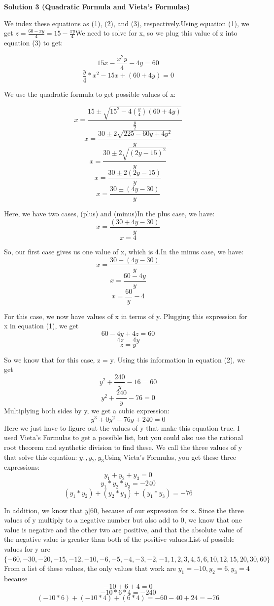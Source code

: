 \begin{enumerate}
\textbf{Solution 3 (Quadratic Formula and Vieta's Formulas)}

We index these equations as (1), (2), and (3), respectively.Using equation (1), we get $z = \frac{60 - xy}{4} = 15 - \frac{xy}{4}$We need to solve for x, so we plug this value of z into equation (3) to get:

 
 \[15x - \frac{x^2y}{4} - 4y = 60\]
 \[\frac{y}{4} * x^2 - 15x + (60 + 4y) = 0\]

 We use the quadratic formula to get possible values of x:

 
 \[x = \frac{15 \pm \sqrt{15^2 - 4(\frac{y}{4})(60 + 4y)}}{\frac{y}{2}}\]
 \[x = \frac{30 \pm 2\sqrt{225 - 60y + 4y^2}}{y}\]
 \[x = \frac{30 \pm 2\sqrt{(2y-15)^2}}{y}\]
 \[x = \frac{30 \pm 2(2y - 15)}{y}\]
 \[x = \frac{30 \pm (4y - 30)}{y}\]

 Here, we have two cases, (plus) and (minus)In the plus case, we have:
 \[x = \frac{(30 + 4y - 30)}{y}\]
 \[x = 4\]

 So, our first case gives us one value of x, which is 4.In the minus case, we have:
 \[x = \frac{30 - (4y - 30)}{y}\]
 \[x = \frac{60 - 4y}{y}\]
 \[x = \frac{60}{y} - 4\]

 For this case, we now have values of x in terms of y. Plugging this expression for x in equation (1), we get
 \[60 - 4y + 4z = 60\]
 \[4z = 4y\]
 \[z = y\]

 So we know that for this case, z = y. Using this information in equation (2), we get
 \[y^2 + \frac{240}{y} - 16 = 60\]
 \[y^2 + \frac{240}{y} - 76 = 0\]Multiplying both sides by y, we get a cubic expression:
 \[y^3 + 0y^2 - 76y + 240 = 0\]Here we just have to figure out the values of y that make this equation true. I used Vieta's Formulas to get a possible list, but you could also use the rational root theorem and synthetic division to find these. We call the three values of y that solve this equation: $y_{1},y_{2},y_{3}$Using Vieta's Formulas, you get these three expressions:
 \[y_{1} + y_{2} + y_{3} = 0\]
 \[y_{1} * y_{2} * y_{3} = -240\]
 \[(y_{1} * y_{2}) + (y_{2} * y_{3}) + (y_{1} * y_{3}) = -76\]

 In addition, we know that $y \vert 60$, because of our expression for x. Since the three values of y multiply to a negative number but also add to 0, we know that one value is negative and the other two are positive, and that the absolute value of the negative value is greater than both of the positive values.List of possible values for y are $\{-60,-30,-20,-15,-12,-10,-6,-5,-4,-3,-2,-1,1,2,3,4,5,6,10,12,15,20,30,60\}$From a list of these values, the only values that work are $y_1 = -10, y_2 = 6, y_3 = 4$ because
 \[-10 + 6 + 4 = 0\]
 \[-10 * 6 * 4 = -240\]
 \[(-10 * 6) + (-10 * 4) + (6 * 4) = -60 - 40 + 24 = -76\]


\end{enumerate}
